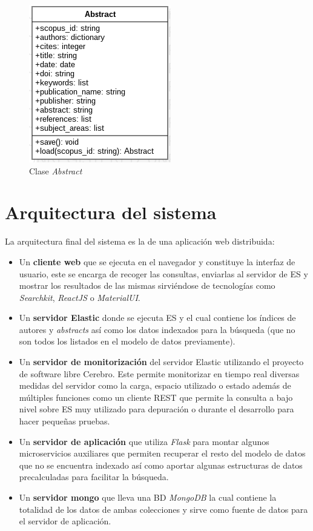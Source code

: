 \begin{figure}[h]
	
	\centering
	\includegraphics[width=0.4\linewidth]{imagenes/Abstract}
	\caption{Clase \textit{Abstract}}
\end{figure}

\newpage

\section{Arquitectura del sistema}

La arquitectura final del sistema es la de una aplicación web distribuida:
\begin{itemize}
	\item Un \textbf{cliente web} que se ejecuta en el navegador y constituye la interfaz de usuario, este se encarga de recoger las consultas, enviarlas al servidor de \acrfull{ES} y mostrar los resultados de las mismas sirviéndose de tecnologías como \textit{Searchkit}, \textit{ReactJS} o \textit{MaterialUI}. 
	
	\item Un \textbf{servidor Elastic} donde se ejecuta \acrshort{ES} y el cual contiene los índices de autores y \textit{abstracts} así como los datos indexados para la búsqueda (que no son todos los listados en el modelo de datos previamente).
	
	\item Un \textbf{servidor de monitorización} del servidor Elastic utilizando el proyecto de software libre Cerebro. Este permite monitorizar en tiempo real diversas medidas del servidor como la carga, espacio utilizado o estado además de múltiples funciones como un cliente REST que permite la consulta a bajo nivel sobre \acrshort{ES} muy utilizado para depuración o durante el desarrollo para hacer pequeñas pruebas.
	
	\item Un \textbf{servidor de aplicación} que utiliza \textit{Flask} para montar algunos microservicios auxiliares que permiten recuperar el resto del modelo de datos que no se encuentra indexado así como aportar algunas estructuras de datos precalculadas para facilitar la búsqueda.
	
	\item Un \textbf{servidor mongo} que lleva una \acrshort{BD} \textit{MongoDB} la cual contiene la totalidad de los datos de ambas colecciones y sirve como fuente de datos para el servidor de aplicación.
	
\end{itemize}


